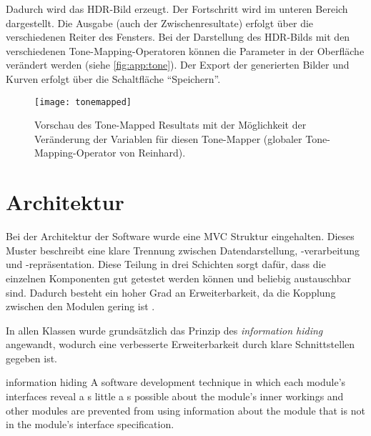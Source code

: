 Dadurch wird das \gls{HDR}-Bild erzeugt. Der Fortschritt wird im unteren Bereich dargestellt. Die Ausgabe (auch der Zwischenresultate) erfolgt über die verschiedenen Reiter des Fensters. Bei der Darstellung des \gls{HDR}-Bilds mit den verschiedenen \gls{Tone-Mapping}-Operatoren können die Parameter in der Oberfläche verändert werden (siehe \autoref{fig:app:tone}). Der Export der generierten Bilder und Kurven erfolgt über die Schaltfläche \enquote{Speichern}.

\begin{figure}
  \begin{center}
    \texttt{[image: tonemapped]}
    \caption{Vorschau des Tone-Mapped Resultats mit der Möglichkeit der Veränderung der Variablen für diesen Tone-Mapper (globaler \gls{Tone-Mapping}-Operator von Reinhard).}
    \label{fig:app:tone}
  \end{center}
\end{figure}










\section{Architektur}
\label{sec:architektur}
Bei der Architektur der Software wurde eine \gls{MVC} Struktur eingehalten. Dieses Muster beschreibt eine klare Trennung zwischen Datendarstellung, -verarbeitung und -repräsentation. Diese Teilung in drei Schichten sorgt dafür, dass die einzelnen Komponenten gut getestet werden können und beliebig austauschbar sind. Dadurch besteht ein hoher Grad an Erweiterbarkeit, da die Kopplung zwischen den Modulen gering ist \cite[S.~413]{ludewig}.

In allen Klassen wurde grundsätzlich das Prinzip des \textit{information hiding} angewandt, wodurch eine verbesserte Erweiterbarkeit durch klare Schnittstellen gegeben ist.

\begin{ieee}{information hiding}
A software development technique in which each module's interfaces reveal a s little a s possible about the module's inner workings and other modules are prevented from using information about the module that is not in the module's interface specification.
\end{ieee}

